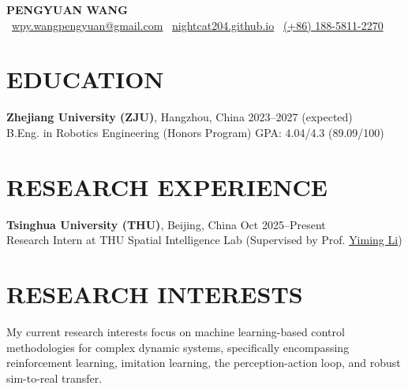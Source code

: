 \documentclass[a4paper,11pt]{article}
\begin{document}
\pagestyle{empty} 

\begin{center}
{\LARGE \textbf{PENGYUAN WANG}}\\[8pt]
\faEnvelope\ \href{mailto:wpy.wangpengyuan@gmail.com}{wpy.wangpengyuan@gmail.com}
\hspace{5ex}
\faGlobe\ \href{https://nightcat204.github.io}{nightcat204.github.io}
\hspace{5ex}
\faPhone\ \href{tel:+8618858112270}{(+86) 188-5811-2270}
\end{center}
\vspace{6pt}

\section{EDUCATION}
\textbf{Zhejiang University (ZJU)}, Hangzhou, China \hfill 2023--2027 (expected) \\
B.Eng. in Robotics Engineering (Honors Program) \hfill GPA: 4.04/4.3 (89.09/100)

\section{RESEARCH EXPERIENCE}
\textbf{Tsinghua University (THU)}, Beijing, China \hfill Oct 2025--Present \\
Research Intern at THU Spatial Intelligence Lab (Supervised by Prof. \href{https://scholar.google.com/citations?hl=en&user=i_aajNoAAAAJ}{Yiming Li})

\section{RESEARCH INTERESTS}
My current research interests focus on machine learning-based control methodologies for complex dynamic systems, specifically encompassing reinforcement learning, imitation learning, the perception-action loop, and robust sim-to-real transfer.
\end{document}
